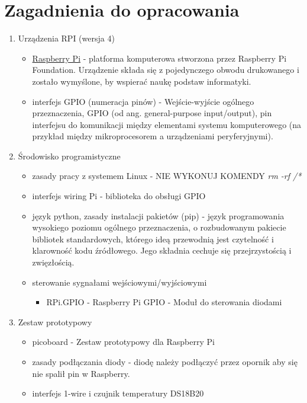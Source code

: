\documentclass[a4paper,12pt]{extarticle}  %
\begin{document}
\section{Zagadnienia do opracowania}
\begin{enumerate}
	\item Urządzenia RPI (wersja 4)
	      \begin{itemize}
		      \item \href{https://www.raspberrypi.org/}{Raspberry Pi} - platforma komputerowa stworzona przez Raspberry Pi Foundation. Urządzenie składa się z pojedynczego obwodu drukowanego i zostało wymyślone, by wspierać naukę podstaw informatyki.
		      \item interfejs GPIO (numeracja pinów) - Wejście-wyjście ogólnego przeznaczenia, GPIO (od ang. general-purpose input/output), pin interfejsu do komunikacji między elementami systemu komputerowego (na przykład między mikroprocesorem a urządzeniami peryferyjnymi).
	      \end{itemize}
	\item Środowisko programistyczne
	      \begin{itemize}
		      \item zasady pracy z systemem Linux - NIE WYKONUJ KOMENDY \emph{rm -rf /*}
		      \item interfejs wiring Pi - biblioteka do obsługi GPIO
		      \item język python, zasady instalacji pakietów (pip) - język programowania wysokiego poziomu ogólnego przeznaczenia, o rozbudowanym pakiecie bibliotek standardowych, którego ideą przewodnią jest czytelność i klarowność kodu źródłowego. Jego składnia cechuje się przejrzystością i zwięzłością.
		      \item sterowanie sygnałami wejściowymi/wyjściowymi
		            \begin{itemize}
			            \item RPi.GPIO - Raspberry Pi GPIO - Moduł do sterowania diodami
		            \end{itemize}
	      \end{itemize}
	\item Zestaw prototypowy
	      \begin{itemize}
		      \item picoboard - Zestaw prototypowy dla Raspberry Pi
		      \item zasady podłączania diody - diodę należy podłączyć przez opornik aby się nie spalił pin w Raspberry.
		      \item interfejs 1-wire i czujnik temperatury DS18B20
	      \end{itemize}
\end{enumerate}
\end{document}
